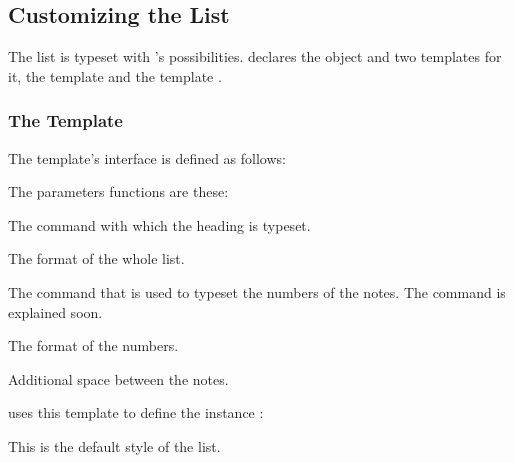 \documentclass[toc=bib,toc=index]{cnpkgdoc}
\begin{document}
\subsection{Customizing the List}\label{ssec:customizing_the_list}
The list is typeset with 's possibilities. \enotez declares
the object  and two templates for it, the template 
and the template .

\subsubsection{The  Template}
The  template's interface is defined as follows:
The parameters functions are these:
\begin{description}[style=nextline]
 \item[\code{heading}] The command with which the heading is typeset.
 \item[\code{format}] The format of the whole list.
 \item[\code{number}] The command that is used to typeset the numbers of the
   notes. The command  is explained soon.
 \item[\code{numbers-format}] The format of the numbers.
 \item[\code{notes-sep}] Additional space between the notes.
\end{description}

\enotez uses this template to define the instance :
\begin{beispiel}
\end{beispiel}
This is the default style of the list.
\end{document}
